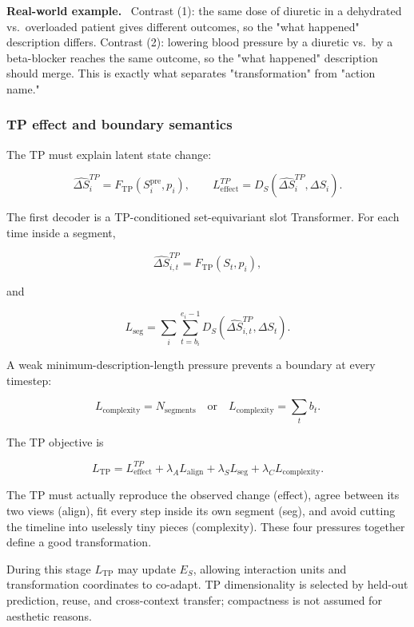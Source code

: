 \documentclass[11pt]{article}
\newenvironment{plainword}{%
  \par\medskip\noindent\begin{minipage}{\textwidth}%
  \color{gray!75!black}\small\itshape
}{%
  \end{minipage}\par\medskip}
\newenvironment{example}{%
  \par\smallskip\noindent\begin{minipage}{\textwidth}%
  \color{teal!60!black}\small
  \textbf{\color{teal!70!black}Real-world example.}\
}{%
  \end{minipage}\par\smallskip}
\begin{document}
\begin{example}
Contrast (1): the same dose of diuretic in a dehydrated vs.\ overloaded patient gives different outcomes, so the "what happened"
description differs. Contrast (2): lowering blood pressure by a diuretic vs.\ by a beta-blocker reaches the same outcome, so the
"what happened" description should merge. This is exactly what separates "transformation" from "action name."
\end{example}

\subsubsection*{TP effect and boundary semantics}

The TP must explain latent state change:

\[
\widehat{\Delta S}_i^{TP}=F_{\mathrm{TP}}(S_i^{\mathrm{pre}},p_i),
\qquad
\boxed{L_{\mathrm{effect}}^{TP}=D_S(\widehat{\Delta S}_i^{TP},\Delta S_i).}
\]

The first decoder is a TP-conditioned set-equivariant slot Transformer. For each time inside a segment,

\[
\widehat{\Delta S}_{i,t}^{TP}=F_{\mathrm{TP}}(S_t,p_i),
\]

and

\[
\boxed{L_{\mathrm{seg}}=\sum_i\sum_{t=b_i}^{e_i-1}
D_S(\widehat{\Delta S}_{i,t}^{TP},\Delta S_t).}
\]

A weak minimum-description-length pressure prevents a boundary at every timestep:

\[
L_{\mathrm{complexity}}=N_{\mathrm{segments}}
\quad\text{or}\quad
L_{\mathrm{complexity}}=\sum_t b_t.
\]

The TP objective is

\[
\boxed{
L_{\mathrm{TP}}=L_{\mathrm{effect}}^{TP}
+\lambda_A L_{\mathrm{align}}
+\lambda_S L_{\mathrm{seg}}
+\lambda_C L_{\mathrm{complexity}}.}
\]

\begin{plainword}
The TP must actually reproduce the observed change (effect), agree between its two views (align), fit every step inside its own
segment (seg), and avoid cutting the timeline into uselessly tiny pieces (complexity). These four pressures together define a good
transformation.
\end{plainword}

During this stage $L_{\mathrm{TP}}$ may update $E_S$, allowing interaction units and transformation coordinates to co-adapt. TP
dimensionality is selected by held-out prediction, reuse, and cross-context transfer; compactness is not assumed for aesthetic
reasons.
\end{document}
